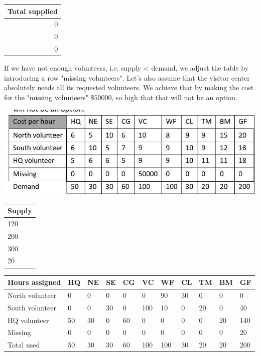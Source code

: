 \documentclass[10pt]{article}
\begin{document}
\begin{tabular}{|r|}
\hline
\multicolumn{1}{|l|}{Total supplied} \\
\hline
0 \\
\hline
0 \\
\hline
0 \\
\hline
\end{tabular}

If we have not enough volunteers, i.e. supply < demand, we adjust the table by introducing a row "missing volunteers". Let's also assume that the visitor center absolutely needs all its requested volunteers. We achieve that by making the cost for the "missing volunteers" $\$ 50000$, so high that that will not be an option.

\includegraphics[max width=\textwidth]{2022_07_05_5945264bba2a5f6ba667g-44}

\begin{tabular}{|l|}
\hline
Supply \\
\hline
120 \\
\hline
200 \\
\hline
300 \\
\hline
20 \\
\hline
\end{tabular}

\begin{tabular}{|l|l|l|l|l|l|l|l|l|l|l|}
\hline
Hours assigned & HQ & NE & SE & CG & VC & WF & CL & TM & BM & GF \\
\hline
North volunteer & 0 & 0 & 0 & 0 & 0 & 90 & 30 & 0 & 0 & 0 \\
\hline
South volunteer & 0 & 0 & 30 & 0 & 100 & 10 & 0 & 20 & 0 & 40 \\
\hline
HQ volunteer & 50 & 30 & 0 & 60 & 0 & 0 & 0 & 0 & 20 & 140 \\
\hline
Missing & 0 & 0 & 0 & 0 & 0 & 0 & 0 & 0 & 0 & 20 \\
\hline
\multicolumn{1}{l}{Total used} & 50 & 30 & 30 & 60 & 100 & 100 & 30 & 20 & 20 & 200 \\
\hline
\end{tabular}
\end{document}
